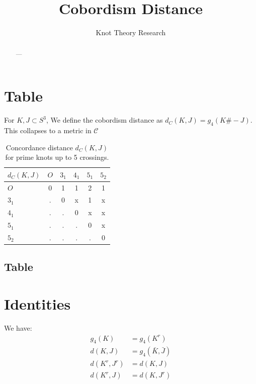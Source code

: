 \documentclass[10pt]{article}
\begin{document}
\title{Cobordism Distance}
\author{Knot Theory Research}

\maketitle

\begin{abstract}

---

\end{abstract}

\pagebreak

\section{Table}

For $K, J \subset S^3$, We define the cobordism distance as $d_C(K, J) = g_4(K\#-J)$. This collapses to a metric in $\mathcal{C}$

\begin{table}[htbp]
  \centering
  \renewcommand{\arraystretch}{1.25} %
  \begin{tabular}{l *{5}{c}}
    \toprule
    $d_C(K, J)$ & $O$ & $3_1$ & $4_1$ & $5_1$ & $5_2$ \\
    \midrule
    $O$         & 0   & 1     & 1     & 2     & 1     \\
    $3_1$       & .   & 0     & x     & 1     & x     \\
    $4_1$       & .   & .     & 0     & x     & x     \\
    $5_1$       & .   & .     & .     & 0     & x     \\
    $5_2$       & .   & .     & .     & .     & 0     \\
    \bottomrule
  \end{tabular}
  \caption{Concordance distance $d_C(K, J)$ for prime knots up to 5 crossings.}
  \label{tab:concordance-distance}
\end{table}

\subsection{Table}


\section{Identities}

We have: 
\begin{align}
  g_4(K) &= g_4(K^r) \\
  d(K, J) &= g_4(\bar{K}, \bar{J}) \\
  d(K^r, J^r) &= d(K,J)\\
  d(K^r, J) &= d(K, J^r)
\end{align}
\end{document}
